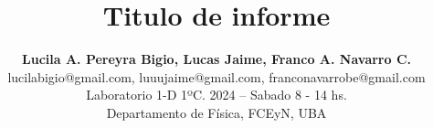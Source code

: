 \setlength{\droptitle}{-100pt}

\title{
    \textbf{
        Titulo de informe
    }
}

\author{
\textbf{
  Lucila A. Pereyra Bigio,
  Lucas Jaime,
  Franco A. Navarro C. }\\
  \footnotesize
  lucilabigio@gmail.com,
  luuujaime@gmail.com,
  franconavarrobe@gmail.com\\
  \footnotesize
  Laboratorio 1-D 1ºC. 2024 – Sabado 8 - 14 hs. \\
  \footnotesize
  Departamento de Física, FCEyN, UBA
}

\date{}

